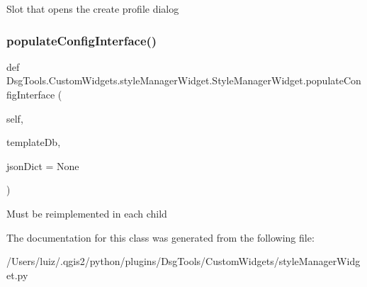 \begin{DoxyVerb}Slot that opens the create profile dialog
\end{DoxyVerb}
 \mbox{\label{class_dsg_tools_1_1_custom_widgets_1_1style_manager_widget_1_1_style_manager_widget_a7ce683581aa995c7c04fc05fbd277c1b}} 
\subsubsection{\texorpdfstring{populate\+Config\+Interface()}{populateConfigInterface()}}
{\footnotesize\ttfamily def Dsg\+Tools.\+Custom\+Widgets.\+style\+Manager\+Widget.\+Style\+Manager\+Widget.\+populate\+Config\+Interface (\begin{DoxyParamCaption}\item[{}]{self,  }\item[{}]{template\+Db,  }\item[{}]{json\+Dict = {\ttfamily None} }\end{DoxyParamCaption})}

\begin{DoxyVerb}Must be reimplemented in each child
\end{DoxyVerb}
 

The documentation for this class was generated from the following file\+:\begin{DoxyCompactItemize}
\item 
/\+Users/luiz/.\+qgis2/python/plugins/\+Dsg\+Tools/\+Custom\+Widgets/style\+Manager\+Widget.\+py\end{DoxyCompactItemize}
